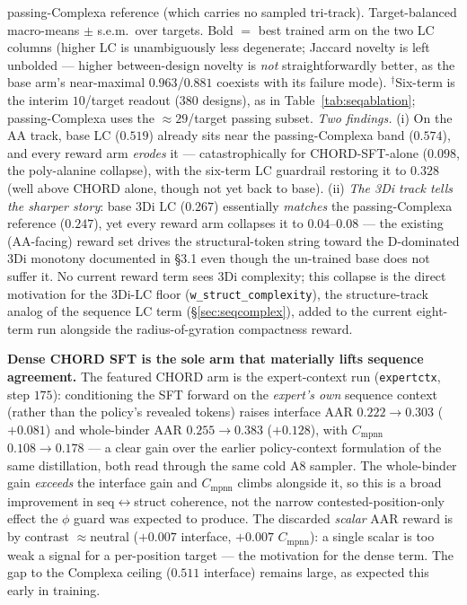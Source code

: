 \documentclass[11pt]{article}
\newcommand{\ttk}[1]{\texttt{\small #1}}
\begin{document}
\begin{table}[htbp]
{passing-Complexa reference (which carries no sampled tri-track). Target-balanced macro-means $\pm$
s.e.m.\ over targets. Bold $=$ best trained arm on the two LC columns (higher LC is unambiguously less
degenerate; Jaccard novelty is left unbolded --- higher between-design novelty is \emph{not}
straightforwardly better, as the base arm's near-maximal $0.963$/$0.881$ coexists with its failure
mode). $^\dagger$Six-term is the interim $10$/target readout ($380$ designs), as in
Table~\ref{tab:seqablation}; passing-Complexa uses the $\approx\!29$/target passing subset.
\emph{Two findings.} (i) On the AA track, base LC ($0.519$) already sits near the passing-Complexa
band ($0.574$), and every reward arm \emph{erodes} it --- catastrophically for CHORD-SFT-alone
($0.098$, the poly-alanine collapse), with the six-term LC guardrail restoring it to $0.328$ (well
above CHORD alone, though not yet back to base). (ii) \emph{The 3Di track tells the
sharper story}: base 3Di LC ($0.267$) essentially \emph{matches} the passing-Complexa reference
($0.247$), yet every reward arm collapses it to $0.04$--$0.08$ --- the existing (AA-facing) reward set
drives the structural-token string toward the D-dominated 3Di monotony documented in \S3.1
even though the un-trained base does not suffer it. No current reward
term sees 3Di complexity; this collapse is the direct motivation for the 3Di-LC floor
(\ttk{w\_struct\_complexity}), the structure-track analog of the sequence LC term
(\S\ref{sec:seqcomplex}), added to the current eight-term run alongside the radius-of-gyration
compactness reward.}
\label{tab:seqdivablation}
\end{table}

\textbf{Dense CHORD SFT is the sole arm that materially lifts sequence agreement.} The featured CHORD
arm is the expert-context run (\ttk{expertctx}, step $175$): conditioning the SFT forward on the
\emph{expert's own} sequence context (rather than the policy's revealed tokens) raises interface AAR
$0.222\!\to\!0.303$ ($+0.081$) and whole-binder AAR $0.255\!\to\!0.383$ ($+0.128$), with
$C_{\mathrm{mpnn}}$ $0.108\!\to\!0.178$ --- a clear gain over the earlier policy-context formulation of
the same distillation, both read through the same cold A8 sampler. The whole-binder gain \emph{exceeds}
the interface gain and $C_{\mathrm{mpnn}}$ climbs alongside it, so this is a broad improvement in
seq$\leftrightarrow$struct coherence, not the narrow contested-position-only effect the $\phi$ guard was
expected to produce. The discarded \emph{scalar} AAR reward is by contrast $\approx$neutral ($+0.007$
interface, $+0.007$ $C_{\mathrm{mpnn}}$): a single scalar is too weak a signal for a per-position target
--- the motivation for the dense term. The gap to the Complexa ceiling ($0.511$ interface) remains
large, as expected this early in training.
\end{document}

